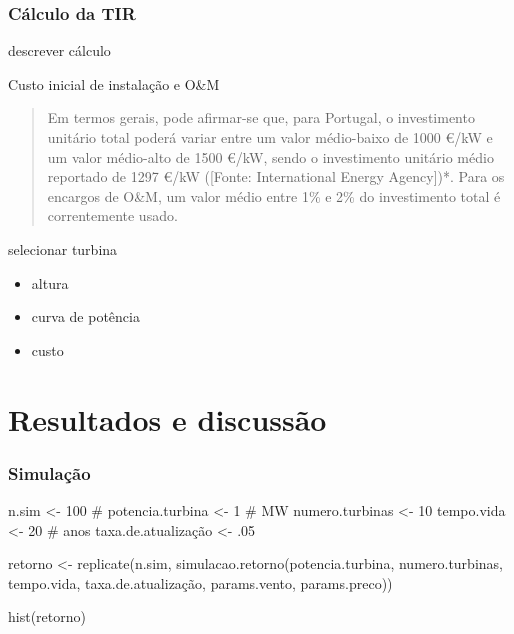 \documentclass[
  letterpaper,
  DIV=11,
  numbers=noendperiod]{scrartcl}
\newenvironment{Shaded}{\begin{snugshade}}{\end{snugshade}}
\newcommand{\CommentTok}[1]{\textcolor[rgb]{0.37,0.37,0.37}{#1}}
\newcommand{\DecValTok}[1]{\textcolor[rgb]{0.68,0.00,0.00}{#1}}
\newcommand{\FunctionTok}[1]{\textcolor[rgb]{0.28,0.35,0.67}{#1}}
\newcommand{\NormalTok}[1]{\textcolor[rgb]{0.00,0.23,0.31}{#1}}
\newcommand{\OtherTok}[1]{\textcolor[rgb]{0.00,0.23,0.31}{#1}}
\begin{document}
\hypertarget{cuxe1lculo-da-tir}{%
\subsubsection{Cálculo da TIR}\label{cuxe1lculo-da-tir}}

descrever cálculo

Custo inicial de instalação e O\&M

\begin{quote}
Em termos gerais, pode afirmar-se que, para Portugal, o investimento
unitário total poderá variar entre um valor médio-baixo de 1000 €/kW e
um valor médio-alto de 1500 €/kW, sendo o investimento unitário médio
reportado de 1297 €/kW ({[}Fonte: International Energy Agency{]})*. Para
os encargos de O\&M, um valor médio entre 1\% e 2\% do investimento
total é correntemente usado.
\end{quote}

selecionar turbina

\begin{itemize}
\item
  altura
\item
  curva de potência
\item
  custo
\end{itemize}

\hypertarget{resultados-e-discussuxe3o}{%
\section{\texorpdfstring{\textbf{Resultados e
discussão}}{Resultados e discussão}}\label{resultados-e-discussuxe3o}}

\hypertarget{simulauxe7uxe3o}{%
\subsubsection{Simulação}\label{simulauxe7uxe3o}}

\begin{Shaded}
\begin{Highlighting}[]
\NormalTok{n.sim }\OtherTok{\textless{}{-}} \DecValTok{100} \CommentTok{\# }
\NormalTok{potencia.turbina }\OtherTok{\textless{}{-}} \DecValTok{1} \CommentTok{\# MW}
\NormalTok{numero.turbinas }\OtherTok{\textless{}{-}} \DecValTok{10}
\NormalTok{tempo.vida }\OtherTok{\textless{}{-}} \DecValTok{20} \CommentTok{\# anos}
\NormalTok{taxa.de.atualização }\OtherTok{\textless{}{-}}\NormalTok{ .}\DecValTok{05}

\NormalTok{retorno }\OtherTok{\textless{}{-}} \FunctionTok{replicate}\NormalTok{(n.sim, }
                      \FunctionTok{simulacao.retorno}\NormalTok{(potencia.turbina, }
\NormalTok{                                        numero.turbinas, }
\NormalTok{                                        tempo.vida, }
\NormalTok{                                        taxa.de.atualização, }
\NormalTok{                                        params.vento, }
\NormalTok{                                        params.preco))}

\FunctionTok{hist}\NormalTok{(retorno)}
\end{Highlighting}
\end{Shaded}
\end{document}
